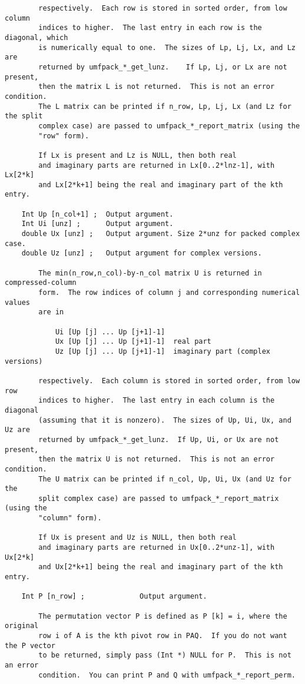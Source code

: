 \documentclass[11pt]{article}
\begin{document}
{\begin{verbatim}
        respectively.  Each row is stored in sorted order, from low column
        indices to higher.  The last entry in each row is the diagonal, which
        is numerically equal to one.  The sizes of Lp, Lj, Lx, and Lz are
        returned by umfpack_*_get_lunz.    If Lp, Lj, or Lx are not present,
        then the matrix L is not returned.  This is not an error condition.
        The L matrix can be printed if n_row, Lp, Lj, Lx (and Lz for the split
        complex case) are passed to umfpack_*_report_matrix (using the
        "row" form).

        If Lx is present and Lz is NULL, then both real
        and imaginary parts are returned in Lx[0..2*lnz-1], with Lx[2*k]
        and Lx[2*k+1] being the real and imaginary part of the kth entry.

    Int Up [n_col+1] ;  Output argument.
    Int Ui [unz] ;      Output argument.
    double Ux [unz] ;   Output argument. Size 2*unz for packed complex case.
    double Uz [unz] ;   Output argument for complex versions.

        The min(n_row,n_col)-by-n_col matrix U is returned in compressed-column
        form.  The row indices of column j and corresponding numerical values
        are in

            Ui [Up [j] ... Up [j+1]-1]
            Ux [Up [j] ... Up [j+1]-1]  real part
            Uz [Up [j] ... Up [j+1]-1]  imaginary part (complex versions)

        respectively.  Each column is stored in sorted order, from low row
        indices to higher.  The last entry in each column is the diagonal
        (assuming that it is nonzero).  The sizes of Up, Ui, Ux, and Uz are
        returned by umfpack_*_get_lunz.  If Up, Ui, or Ux are not present,
        then the matrix U is not returned.  This is not an error condition.
        The U matrix can be printed if n_col, Up, Ui, Ux (and Uz for the
        split complex case) are passed to umfpack_*_report_matrix (using the
        "column" form).

        If Ux is present and Uz is NULL, then both real
        and imaginary parts are returned in Ux[0..2*unz-1], with Ux[2*k]
        and Ux[2*k+1] being the real and imaginary part of the kth entry.

    Int P [n_row] ;             Output argument.

        The permutation vector P is defined as P [k] = i, where the original
        row i of A is the kth pivot row in PAQ.  If you do not want the P vector
        to be returned, simply pass (Int *) NULL for P.  This is not an error
        condition.  You can print P and Q with umfpack_*_report_perm.


\end{verbatim}}
\end{document}
